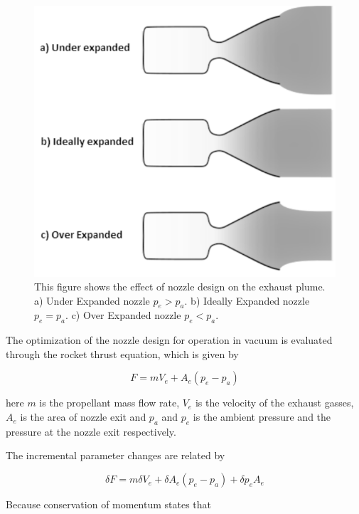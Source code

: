 \begin{figure}[htb]
\begin{center}
\includegraphics[scale=0.7]{figures/navtheory/nozzle}
\caption{This figure shows the effect of nozzle design on the exhaust plume. a) Under Expanded nozzle $p_e>p_a$. b) Ideally Expanded nozzle $p_e=p_a$. c) Over Expanded nozzle $p_e<p_a$. }
\label{fig:jetflows}
\end{center}
\end{figure}

The optimization of the nozzle design for operation in vacuum is evaluated through the rocket thrust equation, which is given by \cite{spacecraft}

\begin{equation}
F=mV_e+A_e(p_e-p_a)
\end{equation}

here $m$ is the propellant mass flow rate,  $V_e$ is the velocity of the exhaust gasses, $A_e$ is the area of nozzle exit and $p_a$ and $p_e$ is the ambient pressure and the pressure at the nozzle exit respectively. 

The incremental parameter changes are related by

\begin{equation}
\delta F=m\delta V_e +\delta A_e(p_e-p_a) +\delta p_e A_e
\end{equation}

Because conservation of momentum states that 

